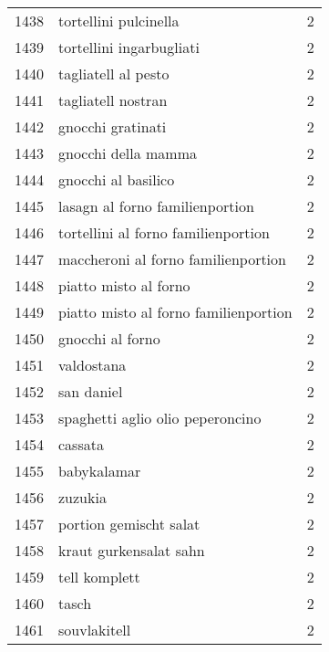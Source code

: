 \begin{tabular}{llr}
1438 &                              tortellini pulcinella &      2 \\
1439 &                           tortellini ingarbugliati &      2 \\
1440 &                                tagliatell al pesto &      2 \\
1441 &                                 tagliatell nostran &      2 \\
1442 &                                  gnocchi gratinati &      2 \\
1443 &                                gnocchi della mamma &      2 \\
1444 &                                gnocchi al basilico &      2 \\
1445 &                    lasagn al forno familienportion &      2 \\
1446 &                tortellini al forno familienportion &      2 \\
1447 &                maccheroni al forno familienportion &      2 \\
1448 &                              piatto misto al forno &      2 \\
1449 &              piatto misto al forno familienportion &      2 \\
1450 &                                   gnocchi al forno &      2 \\
1451 &                                         valdostana &      2 \\
1452 &                                         san daniel &      2 \\
1453 &                   spaghetti aglio olio peperoncino &      2 \\
1454 &                                            cassata &      2 \\
1455 &                                        babykalamar &      2 \\
1456 &                                            zuzukia &      2 \\
1457 &                             portion gemischt salat &      2 \\
1458 &                             kraut gurkensalat sahn &      2 \\
1459 &                                      tell komplett &      2 \\
1460 &                                              tasch &      2 \\
1461 &                                       souvlakitell &      2 \\

\end{tabular}
